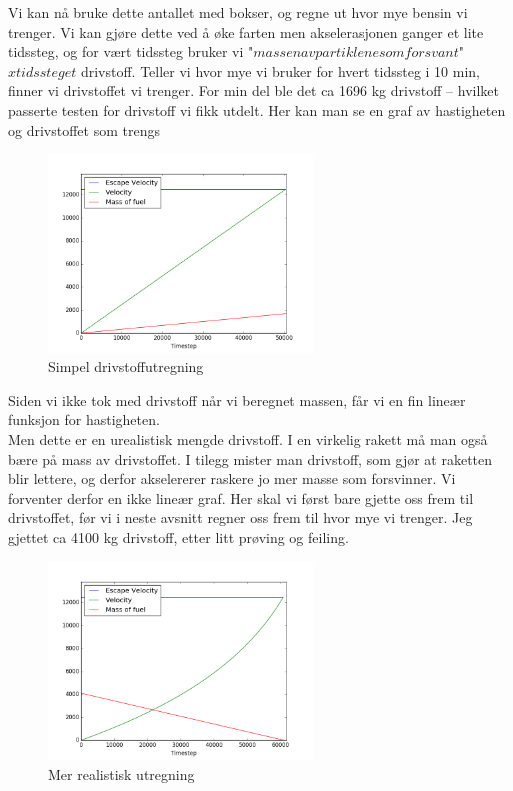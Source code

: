 \documentclass[a4paper,norsk,11pt,twoside]{article}
\begin{document}
Vi kan nå bruke dette antallet med bokser, og regne ut hvor mye bensin vi trenger. Vi kan gjøre dette ved å øke farten men akselerasjonen ganger et lite tidssteg, og for vært tidssteg bruker vi "$massen av partiklene som forsvant$" $x tidssteget$ drivstoff. Teller vi hvor mye vi bruker for hvert tidssteg i 10 min, finner vi drivstoffet vi trenger. For min del ble det ca 1696 kg drivstoff -- hvilket passerte testen for drivstoff vi fikk utdelt. Her kan man se en graf av hastigheten og drivstoffet som trengs

\begin{figure}[hbt]
\begin{center}
\includegraphics[width=70mm]{Fuel_simple.png}
\caption{Simpel drivstoffutregning}\label{fig:finfigur}
\end{center}
\end{figure} 


Siden vi ikke tok med drivstoff når vi beregnet massen, får vi en fin lineær funksjon for hastigheten. \\

Men dette er en urealistisk mengde drivstoff. I en virkelig rakett må man også bære på mass av drivstoffet. I tilegg mister man drivstoff, som gjør at raketten blir lettere, og derfor akselererer raskere jo mer masse som forsvinner. Vi forventer derfor en ikke lineær graf. Her skal vi først bare gjette oss frem til drivstoffet, før vi i neste avsnitt regner oss frem til hvor mye vi trenger. Jeg gjettet ca 4100 kg drivstoff, etter litt prøving og feiling. 

\begin{figure}[hbt]
\begin{center}
\includegraphics[width=70mm]{Fuel_real.png}
\caption{Mer realistisk utregning}\label{fig:finfigur}
\end{center}
\end{figure} 
\end{document}
